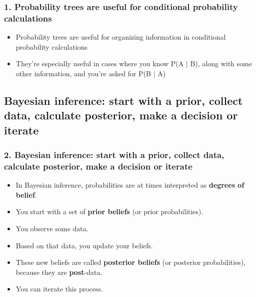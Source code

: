 \documentclass[slidestop,compress,mathserif,11pt,t,professionalfonts,xcolor=table]{beamer}
\begin{document}

\begin{frame}
\frametitle{1. Probability trees are useful for conditional probability calculations}

\begin{itemize}

\item Probability trees are useful for organizing information in conditional probability calculations

\item They're especially useful in cases where you know P(A $|$ B), along with some other information, and you're asked for P(B $|$ A)

\end{itemize}

\end{frame}


\subsection{Bayesian inference: start with a prior, collect data, calculate posterior, make a decision or iterate}
\label{mi2}


\begin{frame}
\frametitle{2. Bayesian inference: start with a prior, collect data, calculate posterior, make a decision or iterate}

\begin{itemize}[<+->]

\item In Bayesian inference, probabilities are at times interpreted as \textbf{degrees of belief}.

\item You start with a set of \textbf{prior beliefs} (or prior probabilities).

\item You observe some data.

\item Based on that data, you update your beliefs.  

\item These new beliefs are called \textbf{posterior beliefs} (or posterior probabilities), because they are \textbf{post}-data.

\item You can iterate this process.

\end{itemize}

\end{frame}
\end{document}
